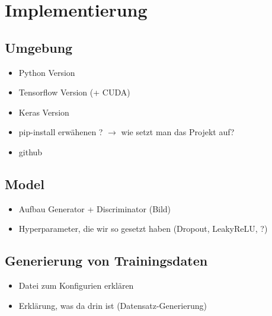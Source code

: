 
\chapter{Implementierung}

\section{Umgebung}
\begin{itemize}
	\item Python Version
	\item Tensorflow Version (+ CUDA)
	\item Keras Version
	\item pip-install erwähenen ? $\rightarrow$ wie setzt man das Projekt auf?
	\item github
\end{itemize}

\section{Model}
\begin{itemize}
	\item Aufbau Generator + Discriminator (Bild)
	\item Hyperparameter, die wir so gesetzt haben (Dropout, LeakyReLU, ?)
\end{itemize}

\section{Generierung von Trainingsdaten}
\begin{itemize}
	\item Datei zum Konfigurien erklären
	\item Erklärung, was da drin ist (Datensatz-Generierung)
\end{itemize}
